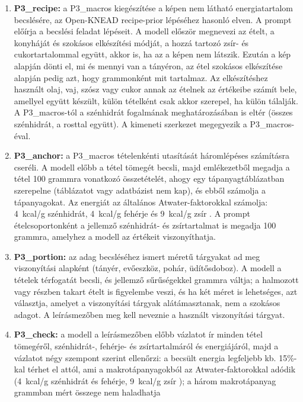 \begin{enumerate}
    \item \textbf{P3\_recipe:} a P3\_macros kiegészítése a képen nem látható energiatartalom 
    becslésére, az Open-KNEAD recipe-prior lépéséhez \cite{coburn2026openknead} hasonló elven. 
    A prompt előírja a becslési feladat lépéseit. A modell először megnevezi az ételt, a konyháját és 
    szokásos elkészítési módját, a hozzá tartozó zsír- és cukortartalommal együtt, akkor is, ha 
    az a képen nem látszik. Ezután a kép alapján dönti el, mi és mennyi van a tányéron, az étel 
    szokásos elkészítése alapján pedig azt, hogy grammonként mit tartalmaz. Az elkészítéshez használt 
    olaj, vaj, szósz vagy cukor annak az ételnek az értékeibe számít bele, amellyel együtt készült, külön 
    tételként csak akkor szerepel, ha külön tálalják. A P3\_macros-tól a szénhidrát fogalmának meghatározásában is 
    eltér (összes szénhidrát, a rosttal együtt). A kimeneti szerkezet megegyezik a P3\_macros-éval.
    \item \textbf{P3\_anchor:} a P3\_macros tételenkénti utasítását háromlépéses számításra cseréli. 
    A modell előbb a tétel tömegét becsli, majd emlékezetből megadja a tétel 100 grammra 
    vonatkozó összetételét, ahogy egy tápanyagtáblázatban szerepelne (táblázatot vagy adatbázist 
    nem kap), és ebből számolja a tápanyagokat. Az energiát az általános Atwater-faktorokkal 
    számolja: 4~kcal/g szénhidrát, 4~kcal/g fehérje és 9~kcal/g zsír \cite{fao2003foodenergy}. 
    A prompt ételcsoportonként a jellemző szénhidrát- és zsírtartalmat is megadja 100 grammra, 
    amelyhez a modell az értékeit viszonyíthatja.
    \item \textbf{P3\_portion:} az adag becsléséhez ismert méretű tárgyakat ad meg viszonyítási 
    alapként (tányér, evőeszköz, pohár, üdítősdoboz). A modell a tételek térfogatát becsli, és 
    jellemző sűrűségekkel grammra váltja; a halmozott vagy részben takart ételt is figyelembe veszi, 
    és ha két méret is lehetséges, azt választja, amelyet a viszonyítási tárgyak alátámasztanak, 
    nem a szokásos adagot. A leírásmezőben meg kell neveznie a használt viszonyítási tárgyat.
    \item \textbf{P3\_check:} a modell a leírásmezőben előbb vázlatot ír minden tétel 
    tömegéről, szénhidrát-, fehérje- és zsírtartalmáról és energiájáról, majd a vázlatot négy 
    szempont szerint ellenőrzi: a becsült energia legfeljebb kb. 15\%-kal térhet el attól, ami a 
    makrotápanyagokból az Atwater-faktorokkal adódik (4~kcal/g szénhidrát és fehérje, 9~kcal/g 
    zsír \cite{fao2003foodenergy}); a három makrotápanyag grammban mért összege nem haladhatja 

\end{enumerate}

